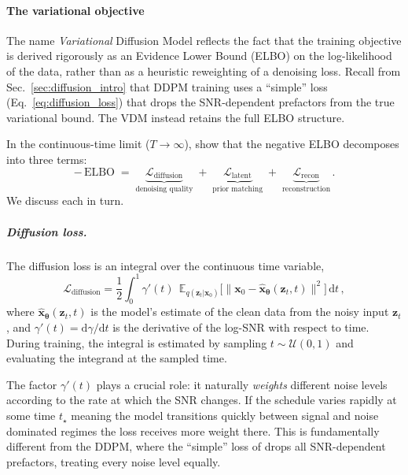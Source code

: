 \paragraph{The variational objective}
\label{sec:vdm_elbo}

The name \emph{Variational} Diffusion Model reflects the fact that the training objective is derived rigorously as an Evidence Lower Bound (ELBO) on the log-likelihood of the data, rather than as a heuristic reweighting of a denoising loss. Recall from Sec.~\ref{sec:diffusion_intro} that DDPM training uses a ``simple'' loss (Eq.~\ref{eq:diffusion_loss}) that drops the SNR-dependent prefactors from the true variational bound. The VDM instead retains the full ELBO structure.

In the continuous-time limit ($T \to \infty$), \citet{kingma_variational_2023} show that the negative ELBO decomposes into three terms:
\begin{equation}
    -\,\text{ELBO} \;=\; \underbrace{\mathcal{L}_{\mathrm{diffusion}}}_{\text{denoising quality}} \;+\; \underbrace{\mathcal{L}_{\mathrm{latent}}}_{\text{prior matching}} \;+\; \underbrace{\mathcal{L}_{\mathrm{recon}}}_{\text{reconstruction}}\,.
    \label{eq:elbo_decomposition}
\end{equation}
We discuss each in turn.

\subparagraph{Diffusion loss.}
The diffusion loss is an integral over the continuous time variable,
\begin{equation}
    \mathcal{L}_{\mathrm{diffusion}} = \frac{1}{2}\int_0^1 \!\gamma'(t)\;\,
    \mathbb{E}_{q(\bm{z}_t|\bm{x}_0)}\!\Big[\big\|\bm{x}_0 - \hat{\bm{x}}_{\bm{\theta}}(\bm{z}_t, t)\big\|^2\Big]\,\mathrm{d}t\,,
    \label{eq:vdm_diffusion_loss}
\end{equation}
where $\hat{\bm{x}}_{\bm{\theta}}(\bm{z}_t, t)$ is the model's estimate of the clean data from the noisy input $\bm{z}_t$, and $\gamma'(t) = \mathrm{d}\gamma / \mathrm{d}t$ is the derivative of the log-SNR with respect to time.
During training, the integral is estimated by sampling $t \sim \mathcal{U}(0,1)$ and evaluating the integrand at the sampled time.

The factor $\gamma'(t)$ plays a crucial role: it naturally \emph{weights} different noise levels according to the rate at which the SNR changes. If the schedule varies rapidly at some time $t_\star$ meaning the model transitions quickly between signal and noise dominated regimes the loss receives more weight there. This is fundamentally different from the DDPM, where the ``simple'' loss of \citet{ho_denoising_2020} drops all SNR-dependent prefactors, treating every noise level equally.

